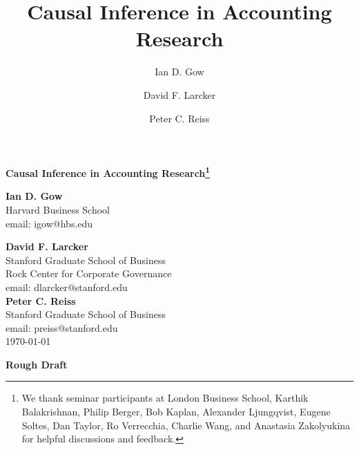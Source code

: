 \documentclass[11pt,reqno,titlepage]{amsart}
\title[Causal Inference in Accounting]{Causal Inference in Accounting Research}
\author{Ian D. Gow}
\author{David F. Larcker}
\author{Peter C. Reiss}
\begin{document}
\usetikzlibrary{automata, shapes, calc, positioning}



\begin{titlepage}
  \centering
  	\begin{large}
  	\textbf{Causal Inference in Accounting Research\footnote{We thank seminar participants at London Business School, Karthik Balakrishnan, Philip Berger, Bob Kaplan, Alexander Ljungqvist, Eugene Soltes, Dan Taylor, Ro Verrecchia, Charlie Wang, and Anastasia Zakolyukina for helpful discussions and feedback.}} \\	
  	\end{large}
  	\vspace{60pt}
	\textbf{Ian D. Gow} \\
	Harvard Business School \\
	email: igow@hbs.edu

  	\vspace{30pt}
	\textbf{David F. Larcker} \\
	Stanford Graduate School of Business \\
	Rock Center for Corporate Governance \\
	email: dlarcker@stanford.edu \\
		
	\vspace{30pt}
	\textbf{Peter C. Reiss} \\
	Stanford Graduate School of Business \\
	email: preiss@stanford.edu \\

	\vspace{30pt}
	\today
	
	\vspace{30pt}
	\centerline{\bf Rough Draft}
	

\end{titlepage}
\end{document}
